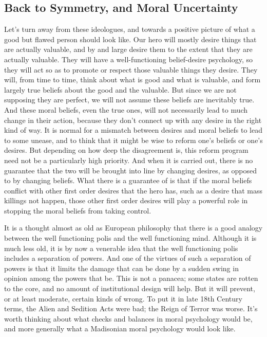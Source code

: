 \subsection{Back to Symmetry, and Moral Uncertainty}
\label{backtosymmetryandmoraluncertainty}

Let's turn away from these ideologues, and towards a positive picture of what a good but flawed person should look like. Our hero will mostly desire things that are actually valuable, and by and large desire them to the extent that they are actually valuable. They will have a well-functioning belief-desire psychology, so they will act so as to promote or respect those valuable things they desire. They will, from time to time, think about what is good and what is valuable, and form largely true beliefs about the good and the valuable. But since we are not supposing they are perfect, we will not assume these beliefs are inevitably true. And these moral beliefs, even the true ones, will not necessarily lead to much change in their action, because they don't connect up with any desire in the right kind of way. It is normal for a mismatch between desires and moral beliefs to lead to some unease, and to think that it might be wise to reform one's beliefs or one's desires. But depending on how deep the disagreement is, this reform program need not be a particularly high priority. And when it is carried out, there is no guarantee that the two will be brought into line by changing desires, as opposed to by changing beliefs. What there is a guarantee of is that if the moral beliefs conflict with other first order desires that the hero has, such as a desire that mass killings not happen, those other first order desires will play a powerful role in stopping the moral beliefs from taking control.

It is a thought almost as old as European philosophy that there is a good analogy between the well functioning polis and the well functioning mind. Although it is much less old, it is by now a venerable idea that the well functioning polis includes a separation of powers. And one of the virtues of such a separation of powers is that it limits the damage that can be done by a sudden swing in opinion among the powers that be. This is not a panacea; some states are rotten to the core, and no amount of institutional design will help. But it will prevent, or at least moderate, certain kinds of wrong. To put it in late 18th Century terms, the Alien and Sedition Acts were bad; the Reign of Terror was worse. It's worth thinking about what checks and balances in moral psychology would be, and more generally what a Madisonian moral psychology would look like.

